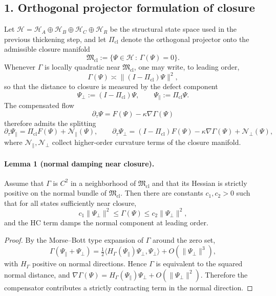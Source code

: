 \subsection*{1. Orthogonal projector formulation of closure}
Let $\mathcal H=\mathcal H_A\oplus\mathcal H_B\oplus\mathcal H_C\oplus\mathcal H_R$
be the structural state space used in the previous thickening step, and let
$\Pi_{\mathrm{cl}}$ denote the orthogonal projector onto the admissible closure
manifold
\[
\mathfrak M_{\mathrm{cl}}:=\{\Psi\in\mathcal H\,:\,\Gamma(\Psi)=0\}.
\]
Whenever $\Gamma$ is locally quadratic near $\mathfrak M_{\mathrm{cl}}$, one may
write, to leading order,
\[
\Gamma(\Psi)\asymp \| (I-\Pi_{\mathrm{cl}})\Psi\|^2,
\]
so that the distance to closure is measured by the defect component
\[
\Psi_{\perp}:=(I-\Pi_{\mathrm{cl}})\Psi,
\qquad
\Psi_{\parallel}:=\Pi_{\mathrm{cl}}\Psi.
\]
The compensated flow
\[
\partial_\tau \Psi = F(\Psi)-\kappa\nabla\Gamma(\Psi)
\]
therefore admits the splitting
\[
\partial_\tau \Psi_{\parallel}=\Pi_{\mathrm{cl}}F(\Psi)+\mathcal N_{\parallel}(\Psi),
\qquad
\partial_\tau \Psi_{\perp}=(I-\Pi_{\mathrm{cl}})F(\Psi)-\kappa\nabla\Gamma(\Psi)+\mathcal N_{\perp}(\Psi),
\]
where $\mathcal N_{\parallel},\mathcal N_{\perp}$ collect higher-order curvature
terms of the closure manifold.

\paragraph{Lemma 1 (normal damping near closure).}
Assume that $\Gamma$ is $C^2$ in a neighborhood of $\mathfrak M_{\mathrm{cl}}$ and that
its Hessian is strictly positive on the normal bundle of
$\mathfrak M_{\mathrm{cl}}$. Then there are constants $c_1,c_2>0$ such that for all
states sufficiently near closure,
\[
c_1\|\Psi_{\perp}\|^2\le \Gamma(\Psi)\le c_2\|\Psi_{\perp}\|^2,
\]
and the HC term damps the normal component at leading order.

\begin{proof}
By the Morse--Bott type expansion of $\Gamma$ around the zero set,
\[
\Gamma(\Psi_{\parallel}+\Psi_{\perp})=
\tfrac12\langle H_{\Gamma}(\Psi_{\parallel})\Psi_{\perp},\Psi_{\perp}\rangle
+O(\|\Psi_{\perp}\|^3),
\]
with $H_{\Gamma}$ positive on normal directions. Hence $\Gamma$ is equivalent to
the squared normal distance, and
$\nabla\Gamma(\Psi)=H_{\Gamma}(\Psi_{\parallel})\Psi_{\perp}+O(\|\Psi_{\perp}\|^2)$.
Therefore the compensator contributes a strictly contracting term in the normal
direction.
\end{proof}

